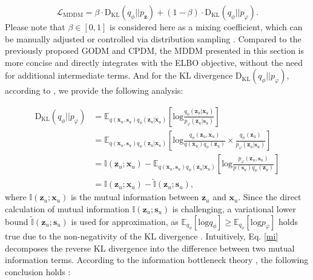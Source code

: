 \documentclass[sigconf]{acmart}
\begin{document}
\begin{equation}
\label{MDDM}
\mathcal L_{\text{MDDM}}=\beta \cdot\text{D}_{\text{KL}}(q_\phi||p_{\mathbf z}) + (1- \beta) \cdot \text{D}_{\text{KL}}(q_\phi||p_{\varphi}).
\end{equation}
Please note that $\beta \in [0,1]$ is considered here as a mixing coefficient, which can be manually adjusted or controlled via distribution sampling \cite{zhang2018mixup}. Compared to the previously proposed GODM and CPDM, the MDDM presented in this section is more concise and directly integrates with the ELBO objective, without the need for additional intermediate terms. And for the KL divergence $\text{D}_{\text{KL}}(q_\phi||p_{\varphi})$, according to \cite{salah2021towards},  we provide the following analysis:

\begin{align}
\label{mi}
\text{D}_{\text{KL}}(q_\phi||p_{\varphi})&=\mathbb E_{q(\mathbf x_u, \mathbf s_u)q_\phi(\mathbf z_u|\mathbf x_u)}\left [ \text{log}\frac{q_\phi(\mathbf z_u|\mathbf x_u)}{p_\varphi(\mathbf z_u|\mathbf s_u)} \right ] \nonumber\\
&=\mathbb E_{q(\mathbf x_u, \mathbf s_u)q_\phi(\mathbf z_u|\mathbf x_u)}\left [ \text{log}\frac{q_\phi(\mathbf z_u,\mathbf x_u)}{q(\mathbf x_u)q_{\phi}(\mathbf z_u)}\times \frac{q_{\phi}(\mathbf z_u)}{p_\varphi(\mathbf z_u|\mathbf s_u)} \right ] \nonumber\\
&=\mathbb I(\mathbf z_u; \mathbf x_u) - \mathbb E_{q(\mathbf x_u, \mathbf s_u)q_\phi(\mathbf z_u|\mathbf x_u)}\left [ \text{log}\frac{p_\varphi(\mathbf z_u,\mathbf s_u)}{p(\mathbf s_u)q_{\phi}(\mathbf z_u)} \right ] \nonumber\\
&= \mathbb I(\mathbf z_u; \mathbf x_u) - \tilde{\mathbb I} (\mathbf z_u; \mathbf s_u),
\end{align}
where $\mathbb I(\mathbf z_u; \mathbf x_u)$ is the mutual information between $\mathbf z_u$ and $\mathbf x_u$. Since the direct calculation of mutual information $\mathbb I(\mathbf z_u; \mathbf s_u)$ is challenging, a variational lower bound $\tilde{\mathbb I} (\mathbf z_u; \mathbf s_u)$ is used for approximation, as $\mathbb E_{q_\phi}[\text{log}q_{\phi}]\ge \mathbb E_{q_\phi}[\text{log}p_{\varphi}]$ holds true due to the non-negativity of the KL divergence \cite{luo2022understanding}. Intuitively, Eq. \ref{mi}
decomposes the reverse KL divergence into the difference between two mutual information terms. According to the information bottleneck theory \cite{cao2022cross}, the following conclusion holds \cite{salah2021towards}:
\end{document}
